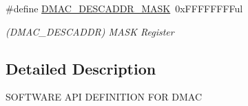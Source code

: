 \begin{DoxyCompactItemize}
\item 
\hypertarget{group___s_a_m_l21___d_m_a_c_ga2aef9cdfe20f976054c42acd853ddc8e}{}\#define \hyperlink{group___s_a_m_l21___d_m_a_c_ga2aef9cdfe20f976054c42acd853ddc8e}{D\+M\+A\+C\+\_\+\+D\+E\+S\+C\+A\+D\+D\+R\+\_\+\+M\+A\+S\+K}~0x\+F\+F\+F\+F\+F\+F\+F\+Ful\label{group___s_a_m_l21___d_m_a_c_ga2aef9cdfe20f976054c42acd853ddc8e}

\begin{DoxyCompactList}\small\item\em (D\+M\+A\+C\+\_\+\+D\+E\+S\+C\+A\+D\+D\+R) M\+A\+S\+K Register \end{DoxyCompactList}\end{DoxyCompactItemize}


\subsection{Detailed Description}
S\+O\+F\+T\+W\+A\+R\+E A\+P\+I D\+E\+F\+I\+N\+I\+T\+I\+O\+N F\+O\+R D\+M\+A\+C 